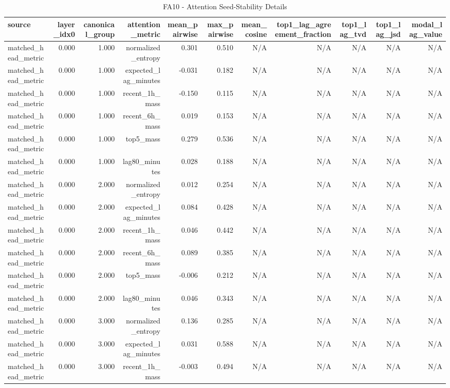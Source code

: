 \begin{table}[h!]
\centering
\caption{FA10 - Attention Seed-Stability Details}
\label{tab:fa10\_-\_attention\_seed-stability\_details}
\begin{tabular}{lrrrrrrrrrr}
\toprule
source & layer\_idx0 & canonical\_group & attention\_metric & mean\_pairwise & max\_pairwise & mean\_cosine & top1\_lag\_agreement\_fraction & top1\_lag\_tvd & top1\_lag\_jsd & modal\_lag\_value \\
\midrule
matched\_head\_metric & 0.000 & 1.000 & normalized\_entropy & 0.301 & 0.510 & N/A & N/A & N/A & N/A & N/A \\
matched\_head\_metric & 0.000 & 1.000 & expected\_lag\_minutes & -0.031 & 0.182 & N/A & N/A & N/A & N/A & N/A \\
matched\_head\_metric & 0.000 & 1.000 & recent\_1h\_mass & -0.150 & 0.115 & N/A & N/A & N/A & N/A & N/A \\
matched\_head\_metric & 0.000 & 1.000 & recent\_6h\_mass & 0.019 & 0.153 & N/A & N/A & N/A & N/A & N/A \\
matched\_head\_metric & 0.000 & 1.000 & top5\_mass & 0.279 & 0.536 & N/A & N/A & N/A & N/A & N/A \\
matched\_head\_metric & 0.000 & 1.000 & lag80\_minutes & 0.028 & 0.188 & N/A & N/A & N/A & N/A & N/A \\
matched\_head\_metric & 0.000 & 2.000 & normalized\_entropy & 0.012 & 0.254 & N/A & N/A & N/A & N/A & N/A \\
matched\_head\_metric & 0.000 & 2.000 & expected\_lag\_minutes & 0.084 & 0.428 & N/A & N/A & N/A & N/A & N/A \\
matched\_head\_metric & 0.000 & 2.000 & recent\_1h\_mass & 0.046 & 0.442 & N/A & N/A & N/A & N/A & N/A \\
matched\_head\_metric & 0.000 & 2.000 & recent\_6h\_mass & 0.089 & 0.385 & N/A & N/A & N/A & N/A & N/A \\
matched\_head\_metric & 0.000 & 2.000 & top5\_mass & -0.006 & 0.212 & N/A & N/A & N/A & N/A & N/A \\
matched\_head\_metric & 0.000 & 2.000 & lag80\_minutes & 0.046 & 0.343 & N/A & N/A & N/A & N/A & N/A \\
matched\_head\_metric & 0.000 & 3.000 & normalized\_entropy & 0.136 & 0.285 & N/A & N/A & N/A & N/A & N/A \\
matched\_head\_metric & 0.000 & 3.000 & expected\_lag\_minutes & 0.031 & 0.588 & N/A & N/A & N/A & N/A & N/A \\
matched\_head\_metric & 0.000 & 3.000 & recent\_1h\_mass & -0.003 & 0.494 & N/A & N/A & N/A & N/A & N/A \\

\end{tabular}
\end{table}
